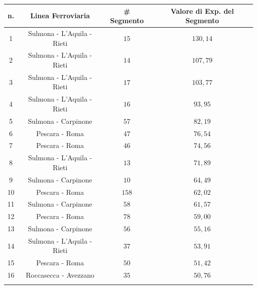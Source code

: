 \begin{table}[h]
\centering
\begin{tabular}{|c|c|c|c|}
\hline
\rowcolor{lightgray}
n. & Linea Ferroviaria          & \# Segmento & Valore di Exp. del Segmento \\ \hline \rowcolor{flamingopink}
1  & Sulmona - L'Aquila - Rieti & $15$        & $130,14$                    \\ \hline \rowcolor{flamingopink}
2  & Sulmona - L'Aquila - Rieti & $14$        & $107,79$                    \\ \hline \rowcolor{flamingopink}
3  & Sulmona - L'Aquila - Rieti & $17$        & $103,77$                    \\ \hline \rowcolor{flamingopink}
4  & Sulmona - L'Aquila - Rieti & $16$        & $93,95$                     \\ \hline \rowcolor{flamingopink}
5  & Sulmona - Carpinone        & $57$        & $82,19$                     \\ \hline \rowcolor{flamingopink}
6  & Pescara - Roma             & $47$        & $76,54$                     \\ \hline \rowcolor{flamingopink}
7  & Pescara - Roma             & $46$        & $74,56$                     \\ \hline \rowcolor{flamingopink}
8  & Sulmona - L'Aquila - Rieti & $13$        & $71,89$                     \\ \hline \rowcolor{flamingopink}
9  & Sulmona - Carpinone        & $10$        & $64,49$                     \\ \hline \rowcolor{flamingopink}
10 & Pescara - Roma             & $158$       & $62,02$                     \\ \hline \rowcolor{flamingopink}
11 & Sulmona - Carpinone        & $58$        & $61,57$                     \\ \hline \rowcolor{flamingopink}
12 & Pescara - Roma             & $78$        & $59,00$                     \\ \hline \rowcolor{flamingopink}
13 & Sulmona - Carpinone        & $56$        & $55,16$                     \\ \hline \rowcolor{flamingopink}
14 & Sulmona - L'Aquila - Rieti & $37$        & $53,91$                     \\ \hline \rowcolor{flamingopink}
15 & Pescara - Roma             & $50$        & $51,42$                     \\ \hline \rowcolor{flamingopink}
16 & Roccasecca - Avezzano      & $35$        & $50,76$                     \\ \hline \rowcolor{flamingopink}

\end{tabular}
\end{table}
